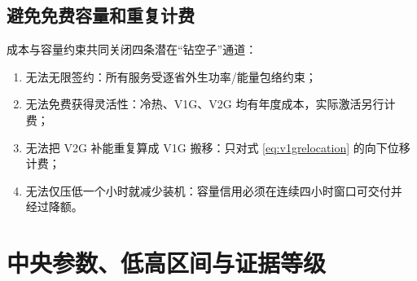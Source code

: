 \documentclass[UTF8,fontset=fandol,12pt]{ctexart}
\begin{document}
\subsection{避免免费容量和重复计费}

成本与容量约束共同关闭四条潜在``钻空子''通道：
\begin{enumerate}
  \item 无法无限签约：所有服务受逐省外生功率/能量包络约束；
  \item 无法免费获得灵活性：冷热、V1G、V2G 均有年度成本，实际激活另行计费；
  \item 无法把 V2G 补能重复算成 V1G 搬移：只对式
  \eqref{eq:v1grelocation} 的向下位移计费；
  \item 无法仅压低一个小时就减少装机：容量信用必须在连续四小时窗口可交付并
  经过降额。
\end{enumerate}

\section{中央参数、低高区间与证据等级}
\end{document}
